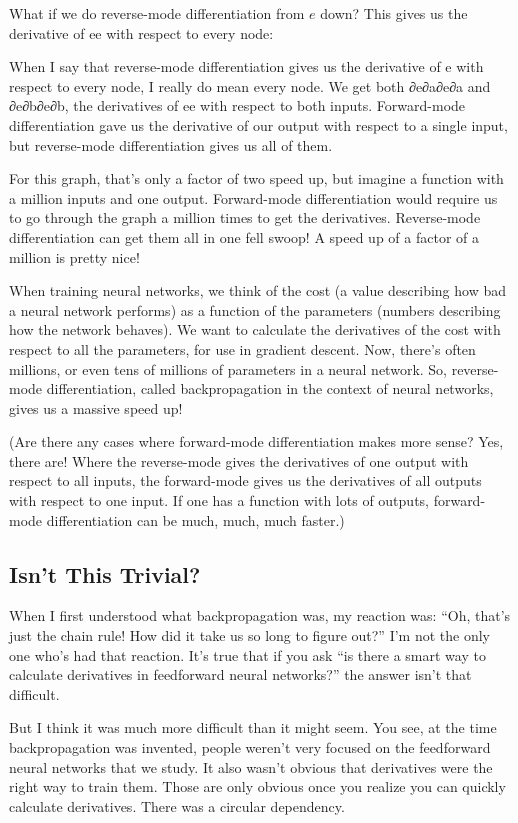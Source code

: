 \documentclass[a4paper,12pt]{report}%
\begin{document}
What if we do reverse-mode differentiation from $e$ down? This gives us the derivative of ee with respect to every node:


When I say that reverse-mode differentiation gives us the derivative of e with respect to every node, I really do mean every node. We get both ∂e∂a∂e∂a and ∂e∂b∂e∂b, the derivatives of ee with respect to both inputs. Forward-mode differentiation gave us the derivative of our output with respect to a single input, but reverse-mode differentiation gives us all of them.

For this graph, that’s only a factor of two speed up, but imagine a function with a million inputs and one output. Forward-mode differentiation would require us to go through the graph a million times to get the derivatives. Reverse-mode differentiation can get them all in one fell swoop! A speed up of a factor of a million is pretty nice!

When training neural networks, we think of the cost (a value describing how bad a neural network performs) as a function of the parameters (numbers describing how the network behaves). We want to calculate the derivatives of the cost with respect to all the parameters, for use in gradient descent. Now, there’s often millions, or even tens of millions of parameters in a neural network. So, reverse-mode differentiation, called backpropagation in the context of neural networks, gives us a massive speed up!

(Are there any cases where forward-mode differentiation makes more sense? Yes, there are! Where the reverse-mode gives the derivatives of one output with respect to all inputs, the forward-mode gives us the derivatives of all outputs with respect to one input. If one has a function with lots of outputs, forward-mode differentiation can be much, much, much faster.)

\subsection{Isn’t This Trivial?}

When I first understood what backpropagation was, my reaction was: “Oh, that’s just the chain rule! How did it take us so long to figure out?” I’m not the only one who’s had that reaction. It’s true that if you ask “is there a smart way to calculate derivatives in feedforward neural networks?” the answer isn’t that difficult.

But I think it was much more difficult than it might seem. You see, at the time backpropagation was invented, people weren’t very focused on the feedforward neural networks that we study. It also wasn’t obvious that derivatives were the right way to train them. Those are only obvious once you realize you can quickly calculate derivatives. There was a circular dependency.
\end{document}
